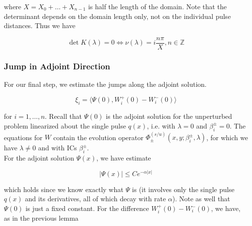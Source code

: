 \documentclass[12pt]{article}
\def\Z{{\mathbb Z}}
\begin{document}
where $X = X_0 + \dots + X_{n-1}$ is half the length of the domain. Note that the determinant depends on the domain length only, not on the individual pulse distances. Thus we have

\[
\det K(\lambda) = 0 \iff \nu(\lambda) = i \frac{n \pi}{X}, n \in \Z
\]

\subsubsection{Jump in Adjoint Direction}

For our final step, we estimate the jumps along the adjoint solution.

\begin{equation}
\xi_i = \langle \Psi(0), W_i^+(0) - W_i^-(0) \rangle 
\end{equation}

for $i = 1, \dots, n$. Recall that $\Psi(0)$ is the adjoint solution for the unperturbed problem linearized about the single pulse $q(x)$, i.e. with $\lambda = 0$ and $\beta_i^\pm = 0$. The equations for $W$ contain the evolution operator $\Phi^{(s/u)}_\pm(x, y; \beta_i^\pm, \lambda)$, for which we have $\lambda \neq 0$ and with ICs $\beta_i^\pm$.\\

For the adjoint solution $\Psi(x)$, we have estimate 

\begin{equation}
|\Psi(x)| \leq C e^{-\alpha|x|}
\end{equation}

which holds since we know exactly what $\Psi$ is (it involves only the single pulse $q(x)$ and its derivatives, all of which decay with rate $\alpha$). Note as well that $\Psi(0)$ is just a fixed constant. For the difference $W_i^+(0) - W_i^-(0)$, we have, as in the previous lemma
\end{document}
